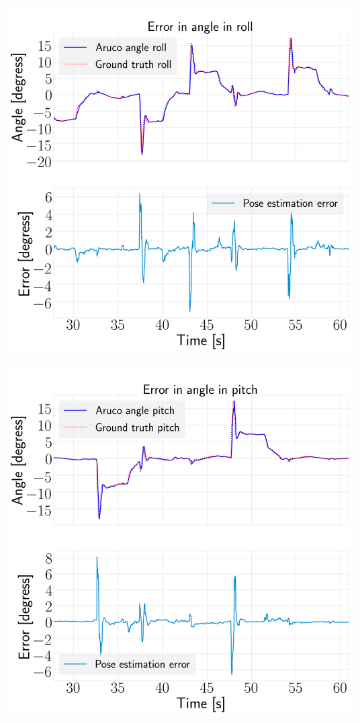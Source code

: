\documentclass[../Head/report.tex]{subfiles}
\begin{document}
\begin{figure}[H]
    \centering
    \begin{subfigure}[t]{.30\textwidth}
        \centering
        \includegraphics[width=\textwidth]{../Figures/vision_navigation/pose_error_roll_test2.png}
        \caption{}
        \label{fig:vision_navigation_error_roll}
    \end{subfigure}
     \hspace{0.2em}
    \begin{subfigure}[t]{.30\textwidth}
        \centering
        \includegraphics[width=\textwidth]{../Figures/vision_navigation/pose_error_pitch_test2.png}

\end{subfigure}
\end{figure}
\end{document}
